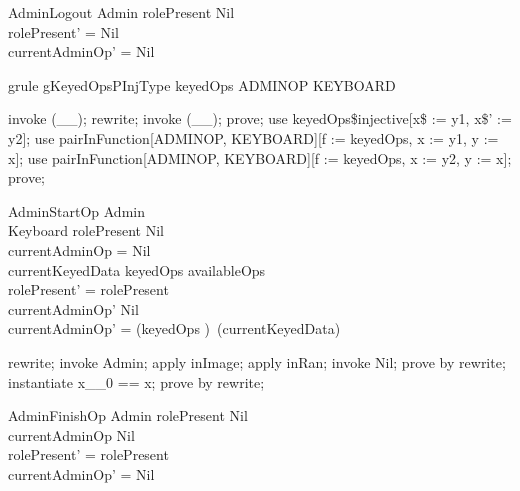
\begin{schema}{AdminLogout}
  \Delta Admin
\where
  rolePresent \neq  Nil\\
  rolePresent' = Nil\\
  currentAdminOp' = Nil
\end{schema}

\begin{theorem}{grule gKeyedOpsPInjType}
keyedOps \in  ADMINOP \pinj  KEYBOARD
\end{theorem}

\begin{zproof}[gKeyedOpsPInjType]
invoke (\_\pinj \_);
rewrite;
invoke (\_\pfun \_);
prove;
use keyedOps\$injective[x\$ := y1, x\$' := y2];
use pairInFunction[ADMINOP, KEYBOARD][f := keyedOps, x := y1, y := x];
use pairInFunction[ADMINOP, KEYBOARD][f := keyedOps, x := y2, y := x];
prove;
\end{zproof}

\begin{schema}{AdminStartOp}
  \Delta Admin\\
  Keyboard
\where
  rolePresent \neq  Nil\\
  currentAdminOp = Nil\\
  currentKeyedData \in  keyedOps \limg  availableOps \rimg \\
  rolePresent' = rolePresent\\
  currentAdminOp' \neq Nil \\
  \The currentAdminOp' = (keyedOps \inv)~(currentKeyedData)
\end{schema}

\begin{zproof}
rewrite;
invoke \Delta Admin;
apply inImage;
apply inRan;
invoke Nil;
prove by rewrite;
instantiate x\_\_0 == x;
prove by rewrite;
\end{zproof}

\begin{schema}{AdminFinishOp}
  \Delta Admin
\where
  rolePresent \neq  Nil\\
  currentAdminOp \neq  Nil\\
  rolePresent' = rolePresent\\
  currentAdminOp' = Nil
\end{schema}

